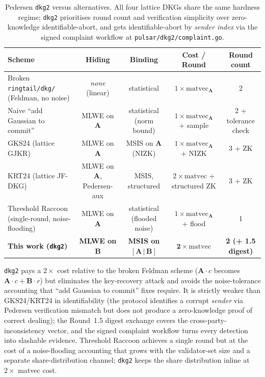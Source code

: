 \begin{table}[h]
\centering
\small
\begin{tabular}{l|c|c|c|c}
\toprule
Scheme & Hiding & Binding & Cost / Round & Round count \\
\midrule
Broken \texttt{ringtail/dkg/} (Feldman, no noise)
        & \emph{none} (linear)
        & statistical
        & $1\times\mathrm{matvec}_\mathbf{A}$
        & 2 \\
Naive ``add Gaussian to commit''
        & MLWE on $\mathbf{A}$
        & statistical (norm bound)
        & $1\times\mathrm{matvec}_\mathbf{A}$ + sample
        & 2 + tolerance check \\
GKS24 \cite{gks24} (lattice GJKR)
        & MLWE on $\mathbf{A}$
        & MSIS on $\mathbf{A}$ (NIZK)
        & $1\times\mathrm{matvec}_\mathbf{A}$ + NIZK
        & 3 + ZK \\
KRT24 \cite{krt24} (lattice JF-DKG)
        & MLWE on $\mathbf{A}$, Pedersen-aux
        & MSIS, structured
        & $2\times\mathrm{matvec}$ + structured ZK
        & 3 + ZK \\
Threshold Raccoon \cite{thresholdraccoon} (single-round, noise-flooding)
        & MLWE on $\mathbf{A}$
        & statistical (flooded noise)
        & $1\times\mathrm{matvec}_\mathbf{A}$ + flood
        & 1 \\
\textbf{This work (\texttt{dkg2})}
        & \textbf{MLWE on $\mathbf{B}$}
        & \textbf{MSIS on $[\mathbf{A}\,|\,\mathbf{B}]$}
        & $\mathbf{2\times\mathrm{matvec}}$
        & \textbf{2 (+ 1.5 digest)} \\
\bottomrule
\end{tabular}
\caption{Pedersen \texttt{dkg2} versus alternatives. All four lattice
DKGs share the same hardness regime; \texttt{dkg2} prioritises round
count and verification simplicity over zero-knowledge identifiable-abort,
and gets identifiable-abort by \emph{sender index} via the signed
complaint workflow at \texttt{pulsar/dkg2/complaint.go}.
\label{tab:dkg-compare}}
\end{table}

\texttt{dkg2} pays a $2\times$ cost relative to the broken Feldman
scheme ($\mathbf{A}\cdot c$ becomes $\mathbf{A}\cdot c + \mathbf{B}\cdot r$)
but eliminates the key-recovery attack and avoids the noise-tolerance
accounting that ``add Gaussian to commit'' fixes require. It is
strictly weaker than GKS24/KRT24 in identifiability (the protocol
identifies a corrupt \emph{sender} via Pedersen verification mismatch
but does not produce a zero-knowledge proof of correct dealing); the
Round~1.5 digest exchange covers the cross-party-inconsistency vector,
and the signed complaint workflow turns every detection into slashable
evidence. Threshold Raccoon \cite{thresholdraccoon} achieves a single
round but at the cost of a noise-flooding accounting that grows with
the validator-set size and a separate share-distribution channel;
\texttt{dkg2} keeps the share distribution inline at $2\times$ matvec
cost.

